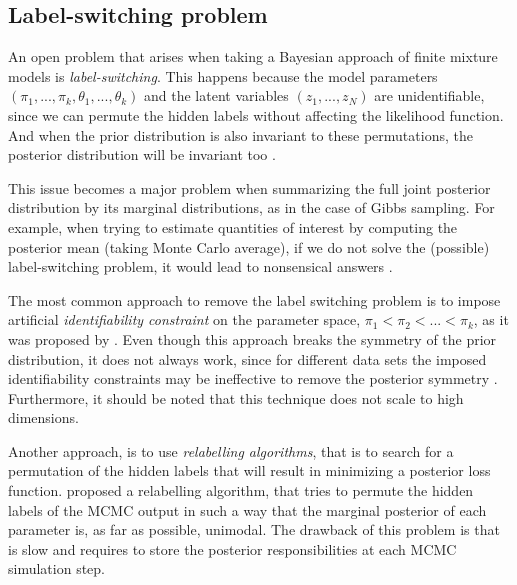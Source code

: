 \subsection{Label-switching problem} \label{fdmm-relable-subsect}
An open problem that arises when taking a Bayesian approach of finite mixture models is \emph{label-switching}. This happens because the model parameters $(\pi_{1},...,\pi_{k},\theta_{1},...,\theta_{k})$ and the latent variables $(z_{1},...,z_{N})$ are unidentifiable, since we can permute the hidden labels without affecting the likelihood function. And when the prior distribution is also invariant to these permutations, the posterior distribution will be invariant too \citep{Rufo2006}.

This issue becomes a major problem when summarizing the full joint posterior distribution by its marginal distributions, as in the case of Gibbs sampling. For example, when trying to estimate quantities of interest by computing the posterior mean (\ie taking Monte Carlo average), if we do not solve the (possible) label-switching problem, it would lead to nonsensical answers \citep{Stephens2000}. 

The most common approach to remove the label switching problem is to impose artificial \emph{identifiability constraint} on the parameter space, \eg $\pi_{1} < \pi_{2} < ... < \pi_{k}$, as it was proposed by \citet{Richardson1997}. Even though this approach breaks the symmetry of the prior distribution, it does not always work, since for different data sets the imposed identifiability constraints may be ineffective to remove the posterior symmetry \citep{Celeux2000}. Furthermore, it should be noted that this technique does not scale to high dimensions. 

Another approach, is to use \emph{relabelling algorithms}, that is to search for a permutation of the hidden labels that will result in minimizing a posterior loss function. \citet{Stephens2000} proposed a relabelling algorithm, that tries to permute the hidden labels of the MCMC output in such a way that the marginal posterior of each parameter is, as far as possible, unimodal. The drawback of this problem is that is slow and requires to store the posterior responsibilities at each MCMC simulation step. 